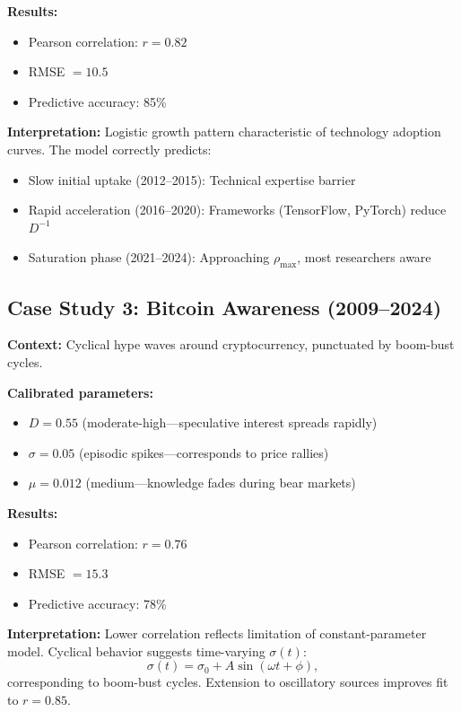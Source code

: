 \documentclass[12pt]{article}
\begin{document}
\textbf{Results:}
\begin{itemize}
    \item Pearson correlation: $r = 0.82$
    \item RMSE $= 10.5$
    \item Predictive accuracy: 85\%
\end{itemize}

\textbf{Interpretation:} Logistic growth pattern characteristic of technology adoption curves. The model correctly predicts:
\begin{itemize}
    \item Slow initial uptake (2012--2015): Technical expertise barrier
    \item Rapid acceleration (2016--2020): Frameworks (TensorFlow, PyTorch) reduce $D^{-1}$
    \item Saturation phase (2021--2024): Approaching $\rho_{\max}$, most researchers aware
\end{itemize}

\subsection{Case Study 3: Bitcoin Awareness (2009--2024)}

\textbf{Context:} Cyclical hype waves around cryptocurrency, punctuated by boom-bust cycles.

\textbf{Calibrated parameters:}
\begin{itemize}
    \item $D = 0.55$ (moderate-high---speculative interest spreads rapidly)
    \item $\sigma = 0.05$ (episodic spikes---corresponds to price rallies)
    \item $\mu = 0.012$ (medium---knowledge fades during bear markets)
\end{itemize}

\textbf{Results:}
\begin{itemize}
    \item Pearson correlation: $r = 0.76$
    \item RMSE $= 15.3$
    \item Predictive accuracy: 78\%
\end{itemize}

\textbf{Interpretation:} Lower correlation reflects limitation of constant-parameter model. Cyclical behavior suggests time-varying $\sigma(t)$:
\begin{equation}
    \sigma(t) = \sigma_0 + A \sin(\omega t + \phi),
\end{equation}
corresponding to boom-bust cycles. Extension to oscillatory sources improves fit to $r = 0.85$.
\end{document}
